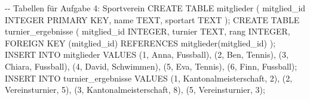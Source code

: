 \documentclass[
  nswissgerman,
  a4paper,
  DIV=11,
  numbers=noendperiod,
  ngerman]{scrreprt}
\newenvironment{Shaded}{\begin{snugshade}}{\end{snugshade}}
\newcommand{\StringTok}[1]{\textcolor[rgb]{0.13,0.47,0.30}{#1}}
\begin{document}
\begin{Shaded}
\begin{Highlighting}[numbers=left,,]
\StringTok{{-}{-} Tabellen für Aufgabe 4: Sportverein}
\StringTok{CREATE TABLE mitglieder (}
\StringTok{    mitglied\_id INTEGER PRIMARY KEY,}
\StringTok{    name        TEXT,}
\StringTok{    sportart    TEXT}
\StringTok{);}
\StringTok{CREATE TABLE turnier\_ergebnisse (}
\StringTok{    mitglied\_id INTEGER,}
\StringTok{    turnier     TEXT,}
\StringTok{    rang        INTEGER,}
\StringTok{    FOREIGN KEY (mitglied\_id) REFERENCES mitglieder(mitglied\_id)}
\StringTok{);}
\StringTok{INSERT INTO mitglieder VALUES}
\StringTok{    (1, \textquotesingle{}Anna\textquotesingle{},   \textquotesingle{}Fussball\textquotesingle{}),}
\StringTok{    (2, \textquotesingle{}Ben\textquotesingle{},    \textquotesingle{}Tennis\textquotesingle{}),}
\StringTok{    (3, \textquotesingle{}Chiara\textquotesingle{}, \textquotesingle{}Fussball\textquotesingle{}),}
\StringTok{    (4, \textquotesingle{}David\textquotesingle{},  \textquotesingle{}Schwimmen\textquotesingle{}),}
\StringTok{    (5, \textquotesingle{}Eva\textquotesingle{},    \textquotesingle{}Tennis\textquotesingle{}),}
\StringTok{    (6, \textquotesingle{}Finn\textquotesingle{},   \textquotesingle{}Fussball\textquotesingle{});}
\StringTok{INSERT INTO turnier\_ergebnisse VALUES}
\StringTok{    (1, \textquotesingle{}Kantonalmeisterschaft\textquotesingle{}, 2),}
\StringTok{    (2, \textquotesingle{}Vereinsturnier\textquotesingle{}, 5),}
\StringTok{    (3, \textquotesingle{}Kantonalmeisterschaft\textquotesingle{}, 8),}
\StringTok{    (5, \textquotesingle{}Vereinsturnier\textquotesingle{}, 3);}


\end{Highlighting}
\end{Shaded}
\end{document}
